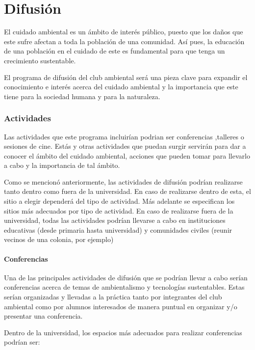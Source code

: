 \chapter{Difusión}

El cuidado ambiental es un ámbito de interés público, puesto que los daños que este sufre afectan a toda la población de una comunidad. Así pues, la educación de una población en el cuidado de este es fundamental para que tenga un crecimiento sustentable.

El programa de difusión del club ambiental será una pieza clave para expandir el conocimiento e interés acerca del cuidado ambiental y la importancia que este tiene para la sociedad humana y para la naturaleza.

\subsection{Actividades}

Las actividades que este programa incluirían podrian ser conferencias ,talleres o sesiones de cine. Estás y otras actividades que puedan surgir servirán para dar a conocer el ámbito del cuidado ambiental, acciones que pueden tomar para llevarlo a cabo y la importancia de tal ámbito.

Como se mencionó anteriormente, las actividades de difusión podrían realizarse tanto dentro como fuera de la universidad. En caso de realizarse dentro de esta, el sitio a elegir dependerá del tipo de actividad. Más adelante se especifican los sitios más adecuados por tipo de actividad. En caso de realizarse fuera de la universidad, todas las actividades podrían llevarse a cabo en instituciones educativas (desde primaria hasta universidad) y comunidades civiles (reunir vecinos de una colonia, por ejemplo)

\subsubsection{Conferencias}

Una de las principales actividades de difusión que se podrían llevar a cabo serían conferencias acerca de temas de ambientalismo y tecnologías sustentables. Estas serían organizadas y llevadas a la práctica tanto por integrantes del club ambiental como por alumnos interesados de manera puntual en organizar y/o presentar una conferencia.

Dentro de la universidad, los espacios más adecuados para realizar conferencias podrían ser:

